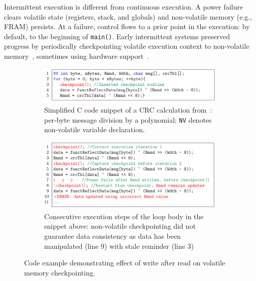 Intermittent execution is different from continuous execution. A power failure clears volatile  state (registers, stack, and globals) and non-volatile memory (e.g., FRAM) persists. At a failure, control flows to a prior point in the execution: by default, to the beginning of {\tt main()}. Early intermittent systems preserved progress by periodically checkpointing volatile execution context to non-volatile memory~\cite{mementos,quickrecall}, sometimes using hardware support~\cite{mementos,mottola2017harvos,hibernusplusplus,hibernus,idetic}. 

\begin{figure}
	\begin{subfigure}[t]{\linewidth}
		\centering \includegraphics[width=\columnwidth]{figures/crc_example}
		\caption{Simplified C code snippet of a CRC calculation from~\cite{hicks_mibench2_2016}: per-byte message division by a polynomial; \texttt{NV} denotes non-volatile variable declaration.}\label{fig:crc_example}
	\end{subfigure}
	\begin{subfigure}[t]{\linewidth}
		\centering \includegraphics[width=\columnwidth]{figures/crc_example_war}
		\caption{Consecutive execution steps of the loop body in the snippet above: non-volatile checkpointing did not guarantee data consistency as data has been manipulated (line 9) with stale reminder (line 3)}\label{fig:crc_example_war}
    \end{subfigure}
	\caption{Code example demonstrating effect of write after read on volatile memory checkpointing.}\label{fig:code_demo_incosistency}
\end{figure}

